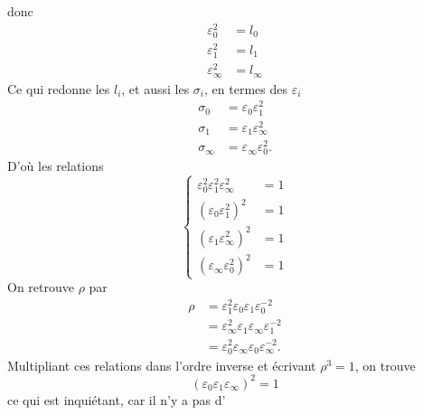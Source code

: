donc
\[
\begin{aligned}
\varepsilon_0^2&=l_0\\
\varepsilon_1^2&=l_1\\
\varepsilon_\infty^2&=l_\infty
\end{aligned}
\]
Ce qui redonne les $l_i$, et aussi les $\sigma_i$,  en termes des $\varepsilon_i$
\[
\begin{aligned}
\sigma_0&=\varepsilon_0\varepsilon_1^2\\
\sigma_1&=\varepsilon_1\varepsilon_\infty^2\\
\sigma_\infty&=\varepsilon_\infty\varepsilon_0^2.
\end{aligned}
\]
D'où les relations
\[
\left\{\begin{aligned}
\varepsilon_0^2\varepsilon_1^2\varepsilon_\infty^2&=1\\
(\varepsilon_0\varepsilon_1^2)^2&=1\\
(\varepsilon_1\varepsilon_\infty^2)^2&=1\\
(\varepsilon_\infty\varepsilon_0^2)^2&=1
\end{aligned}\right.
\]
On retrouve $\rho$  par
\deleted{\[
\rho=\sigma_0\sigma_1=\sigma_1\sigma_\infty=\sigma_\infty\sigma_0
\]}
\inserted{\[
\sigma_0\sigma_1=l_1^{-1}\rho
\]}
\[
\begin{aligned}
\rho&=\varepsilon_1^2\varepsilon_0\varepsilon_1\varepsilon_0^{-2}\\
&=\varepsilon_\infty^2\varepsilon_1\varepsilon_\infty\varepsilon_1^{-2}\\
&=\varepsilon_0^2\varepsilon_\infty\varepsilon_0\varepsilon_\infty^{-2}.
\end{aligned}
\]
Multipliant  ces relations dans l'ordre inverse et écrivant $\rho^3=1$, on trouve
\[
(\varepsilon_0\varepsilon_1\varepsilon_\infty)^2=1
\]
ce qui est inquiétant, car il n'y a pas d'

